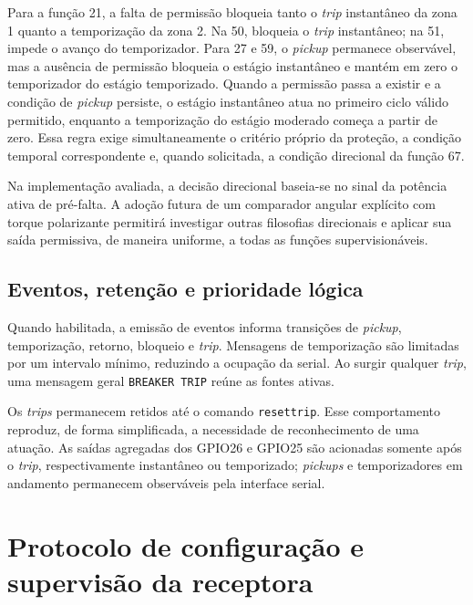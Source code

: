 Para a função 21, a falta de permissão bloqueia tanto o \textit{trip} instantâneo da zona 1 quanto a temporização da zona 2. Na 50, bloqueia o \textit{trip} instantâneo; na 51, impede o avanço do temporizador. Para 27 e 59, o \textit{pickup} permanece observável, mas a ausência de permissão bloqueia o estágio instantâneo e mantém em zero o temporizador do estágio temporizado. Quando a permissão passa a existir e a condição de \textit{pickup} persiste, o estágio instantâneo atua no primeiro ciclo válido permitido, enquanto a temporização do estágio moderado começa a partir de zero. Essa regra exige simultaneamente o critério próprio da proteção, a condição temporal correspondente e, quando solicitada, a condição direcional da função 67.

Na implementação avaliada, a decisão direcional baseia-se no sinal da potência ativa de pré-falta. A adoção futura de um comparador angular explícito com torque polarizante permitirá investigar outras filosofias direcionais e aplicar sua saída permissiva, de maneira uniforme, a todas as funções supervisionáveis.

\subsection{Eventos, retenção e prioridade lógica}

Quando habilitada, a emissão de eventos informa transições de \textit{pickup}, temporização, retorno, bloqueio e \textit{trip}. Mensagens de temporização são limitadas por um intervalo mínimo, reduzindo a ocupação da serial. Ao surgir qualquer \textit{trip}, uma mensagem geral \texttt{BREAKER TRIP} reúne as fontes ativas.

Os \textit{trips} permanecem retidos até o comando \texttt{resettrip}. Esse comportamento reproduz, de forma simplificada, a necessidade de reconhecimento de uma atuação. As saídas agregadas dos GPIO26 e GPIO25 são acionadas somente após o \textit{trip}, respectivamente instantâneo ou temporizado; \textit{pickups} e temporizadores em andamento permanecem observáveis pela interface serial.

\section{Protocolo de configuração e supervisão da receptora}

